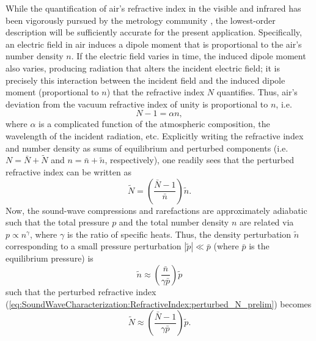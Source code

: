 While the quantification of air's refractive index
in the visible and infrared
has been vigorously pursued by the metrology community
\cite{young_refractivity_of_air, stone_index_of_refraction_of_air,
marchetti_ipt06, mathar_N_IR_07},
the lowest-order description will be sufficiently accurate
for the present application.
Specifically, an electric field in air induces a dipole moment
that is proportional to the air's number density $n$.
If the electric field varies in time,
the induced dipole moment also varies,
producing radiation that alters the incident electric field;
it is precisely this interaction between
the incident field and the induced dipole moment (proportional to $n$)
that the refractive index $N$ quantifies.
Thus, air's deviation from the vacuum refractive index of unity
is proportional to $n$, i.e.\
\begin{equation}
  N - 1 = \alpha n,
  \label{eq:SoundWaveCharacterization:RefractiveIndex:deviation_from_vacuum}
\end{equation}
where $\alpha$ is a complicated function of
the atmospheric composition,
the wavelength of the incident radiation, etc.
Explicitly writing the refractive index and number density
as sums of equilibrium and perturbed components
(i.e.\ $N = \bar{N} + \tilde{N}$ and
$n = \bar{n} + \tilde{n}$, respectively),
one readily sees that the perturbed refractive index can be written as
\begin{equation}
  \tilde{N}
  =
  \left( \frac{\bar{N} - 1}{\bar{n}} \right)
  \tilde{n}
  \label{eq:SoundWaveCharacterization:RefractiveIndex:perturbed_N_prelim}.
\end{equation}
Now, the sound-wave compressions and rarefactions
are approximately adiabatic such that
the total pressure $p$ and the total number density $n$ are related via
$p \propto n^{\gamma}$, where $\gamma$ is the ratio of specific heats.
Thus, the density perturbation $\tilde{n}$
corresponding to a small pressure perturbation $|\tilde{p}| \ll \bar{p}$
(where $\bar{p}$ is the equilibrium pressure) is
\begin{equation}
  \tilde{n}
  \approx
  \left( \frac{\bar{n}}{\gamma \bar{p}} \right)
  \tilde{p}
\end{equation}
such that the perturbed refractive index
(\ref{eq:SoundWaveCharacterization:RefractiveIndex:perturbed_N_prelim})
becomes
\begin{equation}
  \tilde{N}
  \approx
  \left( \frac{\bar{N} - 1}{\gamma \bar{p}} \right)
  \tilde{p}.
  \label{eq:SoundWaveCharacterization:RefractiveIndex:perturbed_N}
\end{equation}
